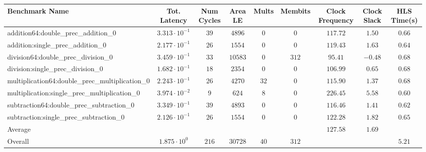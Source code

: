 \begin{tabular}{|l|c|c|c|c|c|c|c|c|}
\hline
Benchmark Name                                   & Tot. Latency            & Num Cycles & Area LE   & Mults  & Membits & Clock Frequency & Clock Slack & HLS Time(s) \\
\hline
addition64:double\_prec\_addition\_0             & $ 3.313 \cdot 10^{-1} $ & $ 39     $ & $ 4896  $ & $ 0  $ & $ 0   $ & $ 117.72      $ & $ 1.50    $ & $ 0.66    $ \\
addition:single\_prec\_addition\_0               & $ 2.177 \cdot 10^{-1} $ & $ 26     $ & $ 1554  $ & $ 0  $ & $ 0   $ & $ 119.43      $ & $ 1.63    $ & $ 0.64    $ \\
division64:double\_prec\_division\_0             & $ 3.459 \cdot 10^{-1} $ & $ 33     $ & $ 10583 $ & $ 0  $ & $ 312 $ & $ 95.41       $ & $ -0.48   $ & $ 0.68    $ \\
division:single\_prec\_division\_0               & $ 1.682 \cdot 10^{-1} $ & $ 18     $ & $ 2354  $ & $ 0  $ & $ 0   $ & $ 106.99      $ & $ 0.65    $ & $ 0.68    $ \\
multiplication64:double\_prec\_multiplication\_0 & $ 2.243 \cdot 10^{-1} $ & $ 26     $ & $ 4270  $ & $ 32 $ & $ 0   $ & $ 115.90      $ & $ 1.37    $ & $ 0.68    $ \\
multiplication:single\_prec\_multiplication\_0   & $ 3.974 \cdot 10^{-2} $ & $ 9      $ & $ 624   $ & $ 8  $ & $ 0   $ & $ 226.45      $ & $ 5.58    $ & $ 0.60    $ \\
subtraction64:double\_prec\_subtraction\_0       & $ 3.349 \cdot 10^{-1} $ & $ 39     $ & $ 4893  $ & $ 0  $ & $ 0   $ & $ 116.46      $ & $ 1.41    $ & $ 0.62    $ \\
subtraction:single\_prec\_subtraction\_0         & $ 2.126 \cdot 10^{-1} $ & $ 26     $ & $ 1554  $ & $ 0  $ & $ 0   $ & $ 122.28      $ & $ 1.82    $ & $ 0.65    $ \\
\hline
Average                                          & $                     $ & $        $ & $       $ & $    $ & $     $ & $ 127.58      $ & $ 1.69    $ & $         $ \\
\hline
Overall                                          & $ 1.875 \cdot 10^{0}  $ & $ 216    $ & $ 30728 $ & $ 40 $ & $ 312 $ & $             $ & $         $ & $ 5.21    $ \\
\hline
\end{tabular}
